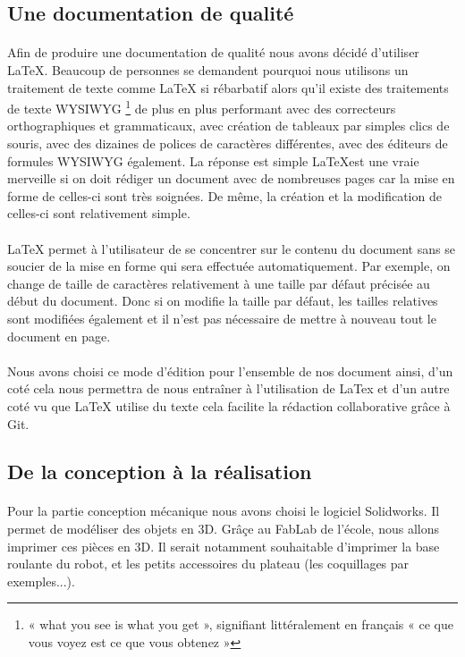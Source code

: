 \documentclass[12pt,a4paper]{article}
\begin{document}
\subsection{Une documentation de qualité}
\paragraph{}
Afin de produire une documentation de qualité nous avons décidé d'utiliser \LaTeX. 
Beaucoup de personnes se demandent pourquoi nous utilisons un traitement de texte comme LaTeX si 
rébarbatif alors qu'il existe des traitements de texte WYSIWYG \footnote{« what you see is what you get », signifiant 
littéralement en français « ce que vous voyez est ce que vous obtenez »} de plus en plus performant avec 
des correcteurs orthographiques et grammaticaux, avec création de tableaux par simples clics de souris, 
avec des dizaines de polices de caractères différentes, avec des éditeurs de formules WYSIWYG également.
La réponse est simple \LaTeX  est une vraie merveille si on doit rédiger un document avec de nombreuses pages car la mise 
en forme de celles-ci sont très soignées. De même, la création et la modification de celles-ci sont relativement simple.

\paragraph{}
LaTeX permet à l'utilisateur de se concentrer sur le contenu du document sans se soucier de la mise en forme qui sera 
effectuée automatiquement. Par exemple, on change de taille de caractères relativement à une taille par défaut 
précisée au début du document. Donc si on modifie la taille par défaut, les tailles relatives sont modifiées également 
et il n'est pas nécessaire de mettre à nouveau tout le document en page.

\paragraph{}
Nous avons choisi ce mode d'édition pour l'ensemble de nos document ainsi, d'un coté cela nous permettra 
de nous entraîner à l'utilisation de LaTex et d'un autre coté vu que LaTeX utilise du texte cela 
facilite la rédaction collaborative grâce à Git. 

\subsection{De la conception à la réalisation}
\paragraph{}
Pour la partie conception mécanique nous avons choisi 
le logiciel Solidworks. Il permet de modéliser des objets en 3D. Grâçe au FabLab de l'école, nous allons imprimer 
ces pièces en 3D. Il serait notamment souhaitable d'imprimer la base roulante du robot, et les petits accessoires 
du plateau (les coquillages par exemples...).
\end{document}
